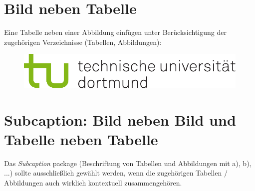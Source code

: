 \section{Bild neben Tabelle}
Eine Tabelle neben einer Abbildung einfügen unter Berücksichtigung der zugehörigen Verzeichnisse (Tabellen, Abbildungen):
\begin{figure}[htbp]
%
	\begin{minipage}[t]{0.45\textwidth}
	\centering
	\label{tab:bsp2}
	\end{minipage}
%
	\begin{minipage}[t]{0.45\textwidth}
	\centering
	  \includegraphics[width=\textwidth]{images/logos/tud_logo_rgb}
	\end{minipage}
\end{figure}


\section{Subcaption: Bild neben Bild und Tabelle neben Tabelle}

Das \textit{Subcaption} package (Beschriftung von Tabellen und Abbildungen mit a), b), ...) sollte ausschließlich gewählt werden,
wenn die zugehörigen Tabellen / Abbildungen auch wirklich kontextuell zusammengehören.

